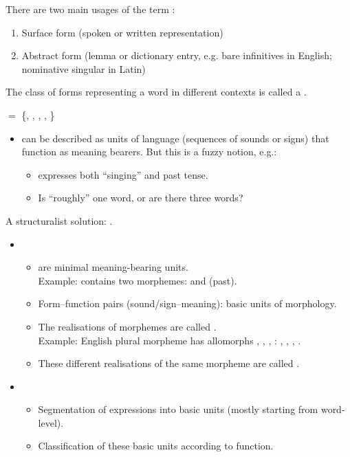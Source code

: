 \documentclass[a4paper,landscape,headrule,footrule]{foils}
\begin{document}
  There are two main usages of the term :
  \begin{enumerate}
    \item Surface form (spoken or written representation)
    \item Abstract form (lemma or dictionary entry, e.g. bare infinitives in English; nominative singular in Latin)
  \end{enumerate}
  \medskip
  The class of forms representing a word in different contexts is called a .
  \begin{center}
     $=$ \{, , , , \}
  \end{center}  

  \begin{itemize}
  \item {} can be described as units of language (sequences of sounds or signs) that function as meaning bearers. But this is a fuzzy notion, e.g.:
    \begin{itemize}
    \item {} expresses both ``singing'' and past tense.
    \item Is  ``roughly'' one word, or are there three words?
    \end{itemize}
  \end{itemize}
  \medskip
  A structuralist solution: .



\begin{itemize}
\item {} 
  \begin{itemize}
    \item {} are minimal meaning-bearing units.\\
          Example:  contains two morphemes:  and  (past).
    \item Form–function pairs (sound/sign–meaning): basic units of morphology.
    \item The realisations of morphemes are called .\\
          Example: English plural morpheme \txx{[number pl]} has allomorphs , , , \eng{$\emptyset$}: , , , .
    \item These different realisations of the same morpheme are called .
  \end{itemize}
\item {}\\
  \begin{itemize}
    \item Segmentation of expressions into basic units (mostly starting from word-level).
    \item Classification of these basic units according to function.
    \end{itemize}
\end{itemize}
\end{document}
